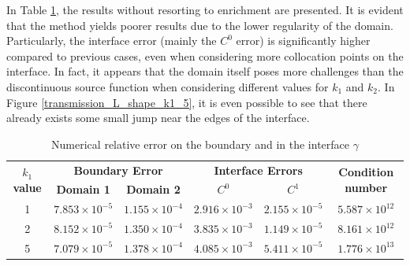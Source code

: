 In Table \ref{tab:transmission_results_L_shape_rectangles}, the results without resorting to enrichment are presented. It is evident that the method yields poorer results due to the lower regularity of the domain. Particularly, the interface error (mainly the \(C^0\) error) is significantly higher compared to previous cases, even when considering more collocation points on the interface. In fact, it appears that the domain itself poses more challenges than the discontinuous source function when considering different values for \(k_1\) and \(k_2\). In Figure \ref{transmission_L_shape_k1_5}, it is even possible to see that there already exists some small jump near the edges of the interface.

\begin{table}[htbp]
    \centering
    \begin{tabular}{cccccc}
      \toprule
      \multirow{2}{*}{\textbf{\(k_1\) value}} & \multicolumn{2}{c}{\textbf{Boundary Error}} & \multicolumn{2}{c}{\textbf{Interface Errors}} & \multirow{2}{*}{\textbf{Condition number}} \\
      \cmidrule(lr){2-3} \cmidrule(lr){4-5}
      & \textbf{Domain 1} & \textbf{Domain 2} & \textbf{\(C^0\)} & \textbf{\(C^1\)} & \\
      \midrule
      1 & $7.853\times10^{-5}$ & $1.155\times10^{-4}$ & $2.916\times10^{-3}$ & $2.155\times10^{-5}$ & $5.587\times 10^{12}$ \\
      2 & $8.152\times10^{-5}$ & $1.350\times10^{-4}$ & $3.835\times10^{-3}$ & $1.149\times10^{-5}$ & $8.161\times 10^{12}$ \\
      5 & $7.079\times10^{-5}$ & $1.378\times10^{-4}$ & $4.085\times10^{-3}$ & $5.411\times10^{-5}$ & $1.776\times 10^{13}$ \\
      \bottomrule
    \end{tabular}
    \caption{Numerical relative error on the boundary and in the interface \(\gamma\)}
    \label{tab:transmission_results_L_shape_rectangles}
\end{table}


